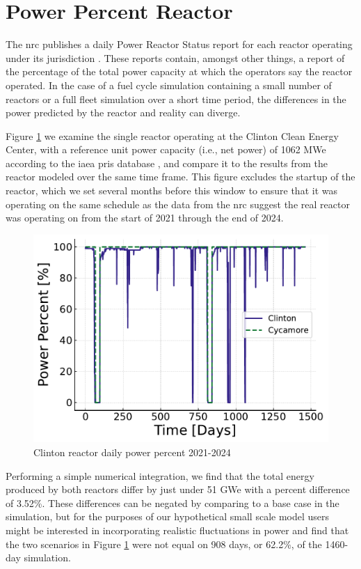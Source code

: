 \section{Power Percent Reactor}
\label{sec:pp_reactor}

The \gls{nrc} publishes a daily Power Reactor Status report for each reactor operating under its jurisdiction \cite{nrc_power_2025}. These reports contain, amongst other things, a report of the percentage of the total power capacity at which the operators say the reactor operated. In the case of a fuel cycle simulation containing a small number of reactors or a full fleet simulation over a short time period, the differences in the power predicted by the \cycamore reactor and reality can diverge.

Figure \ref{fig:pp_full} we examine the single reactor operating at the Clinton Clean Energy Center, with a reference unit power capacity (i.e., net power) of 1062 MWe according to the \gls{iaea} \gls{pris} database \cite{IAEA_PRIS}, and compare it to the results from the \cycamore reactor modeled over the same time frame. This figure excludes the startup of the \cycamore reactor, which we set several months before this window to ensure that it was operating on the same schedule as the data from the \gls{nrc} suggest the real reactor was operating on from the start of 2021 through the end of 2024.

\begin{figure}
  \centering
  \includegraphics[scale=0.7]{images/power_reactor/power_percent_clinton_fake.pdf}
  \caption{Clinton reactor daily power percent 2021-2024}
  \label{fig:pp_full}
\end{figure}

Performing a simple numerical integration, we find that the total energy produced by both reactors differ by just under 51 GWe with a percent difference of 3.52\%. These differences can be negated by comparing to a base case in the simulation, but for the purposes of our hypothetical small scale model users might be interested in incorporating realistic fluctuations in power and find that the two scenarios in Figure \ref{fig:pp_full} were not equal on 908 days, or 62.2\%, of the 1460-day simulation.

